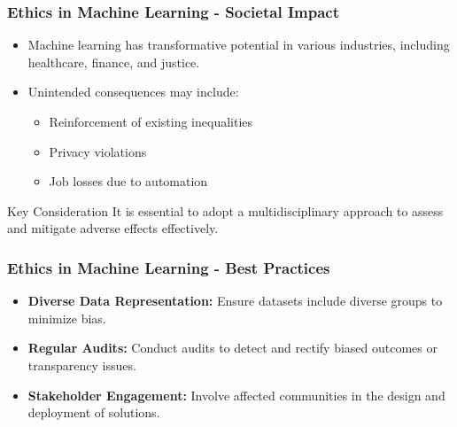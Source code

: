 \documentclass[aspectratio=169]{beamer}
\begin{document}
\begin{frame}[fragile]
    \frametitle{Ethics in Machine Learning - Societal Impact}
    \begin{itemize}
        \item Machine learning has transformative potential in various industries, including healthcare, finance, and justice.
        \item Unintended consequences may include:
        \begin{itemize}
            \item Reinforcement of existing inequalities
            \item Privacy violations
            \item Job losses due to automation
        \end{itemize}
    \end{itemize}
    \begin{block}{Key Consideration}
        It is essential to adopt a multidisciplinary approach to assess and mitigate adverse effects effectively.
    \end{block}
\end{frame}

\begin{frame}[fragile]
    \frametitle{Ethics in Machine Learning - Best Practices}
    \begin{itemize}
        \item \textbf{Diverse Data Representation:} Ensure datasets include diverse groups to minimize bias.
        \item \textbf{Regular Audits:} Conduct audits to detect and rectify biased outcomes or transparency issues.
        \item \textbf{Stakeholder Engagement:} Involve affected communities in the design and deployment of solutions.
    \end{itemize}
\end{frame}
\end{document}
